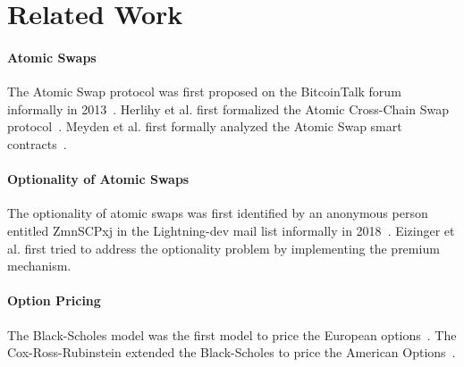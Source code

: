 \section{Related Work}
\label{sec:related_work}

\paragraph{Atomic Swaps}
The Atomic Swap protocol was first proposed on the BitcoinTalk forum informally in 2013~\cite{nolan2013alt}.
Herlihy et al. first formalized the Atomic Cross-Chain Swap protocol~\cite{herlihy2018atomic}.
Meyden et al. first formally analyzed the Atomic Swap smart contracts~\cite{van2018specification}.

\paragraph{Optionality of Atomic Swaps}
The optionality of atomic swaps was first identified by an anonymous person entitled ZmnSCPxj in the Lightning-dev mail list informally in 2018~\cite{optionality-origin}.
Eizinger et al. first tried to address the optionality problem by implementing the premium mechanism\cite{first-attempt-optionality}.

\paragraph{Option Pricing}
The Black-Scholes model was the first model to price the European options~\cite{black1973pricing}.
The Cox-Ross-Rubinstein extended the Black-Scholes to price the American Options~\cite{cox1979option}.